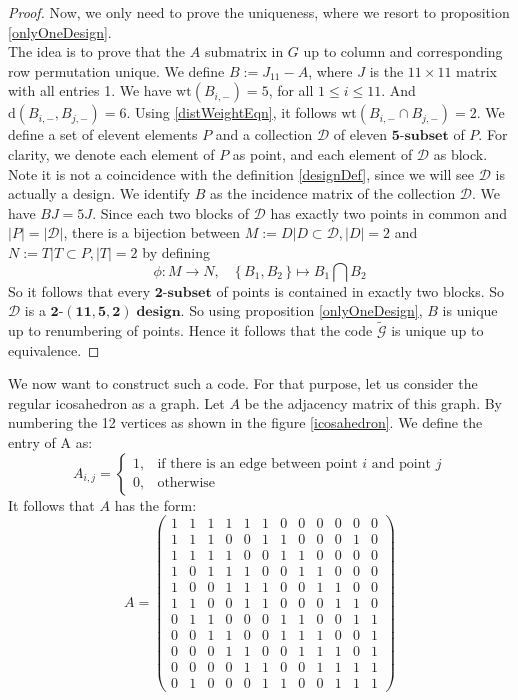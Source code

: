 \documentclass[12pt]{article}
\theoremstyle{definition}
\numberwithin{equation}{theorem}
\numberwithin{figure}{theorem}
\newcommand{\tParamDesign}[4]{\ensuremath{\bm{#1\mbox{-}(#2,#3,#4)\; design}}}
\newcommand{\dDes}{\ensuremath{\mathcal{D}}}
\newcommand{\cCodes}{\ensuremath{\widetilde{\mathcal{G}}}}
\newcommand{\tSubset}[1]{\ensuremath{\bm{#1\mbox{-}{subset}}}}
\newcommand{\wt}[1]{\ensuremath{\text{wt}(#1)}}
\newcommand{\dist}[2]{\ensuremath{\text{d}(#1,#2)}}
\begin{document}
\begin{proof}
Now, we only need to prove the uniqueness, where we resort to proposition \ref{onlyOneDesign}.\\
The idea is to prove that the $A$ submatrix in $G$ up to column and corresponding row permutation %
unique. We define $B := J_{11} - A$, where $J$ is the $11 \times 11$ matrix with all entries 1. We have $\wt{B_{i,-}} = 5$, for all $1 \leq i \leq 11$. And $\dist{B_{i,-}}{B_{j,-}} = 6$. Using \ref{distWeightEqn}, it follows $\wt{B_{i,-} \cap B_{j,-}} = 2$. We define a set of elevent elements $P$ and a collection {\dDes} of eleven {\tSubset{5}} of $P$. For clarity, we denote each element of $P$ as point, and each element of {\dDes} as block. Note it is not a coincidence with the definition \ref{designDef}, since we will see {\dDes} is actually a design. We identify $B$ as the incidence matrix of the collection {\dDes}. We have $BJ = 5J$. Since each two blocks of {\dDes} has exactly two points in common and $|P| = |\dDes|$, there is a bijection between $M  := {D| D \subset \dDes, |D| = 2}$ and $N := {T|T \subset P, |T| = 2}$ by defining 
\[
	\phi: M \rightarrow N, \quad \{\,B_1,B_2\,\} \mapsto B_1 \bigcap B_2
\]
So it follows that every {\tSubset{2}} of points is contained in exactly two blocks. So {\dDes} is a {\tParamDesign{2}{11}{5}{2}}. So using proposition \ref{onlyOneDesign}, $B$ is unique up to renumbering of points. Hence it follows that the code {\cCodes} is unique up to equivalence.
\end{proof}

We now want to construct such a code. For that purpose, let us consider the regular icosahedron as a graph. Let $A$ be the adjacency matrix of this graph. By numbering the 12 vertices as shown in the figure \ref{icosahedron}. We define the entry of A as:
\[
	A_{i,j} = 
	\begin{cases}
		1, &\text{if there is an edge between point $i$ and point $j$}\\
		0, &\text{otherwise}
	\end{cases}
\]
It follows that $A$ has the form:
\[
	A =
	\begin{pmatrix}
		 1 & 1 & 1 & 1 & 1 & 1 & 0 & 0 & 0 & 0 & 0 & 0 \\ 
1 & 1 & 1 & 0 & 0 & 1 & 1 & 0 & 0 & 0 & 1 & 0 \\ 
1 & 1 & 1 & 1 & 0 & 0 & 1 & 1 & 0 & 0 & 0 & 0 \\ 
1 & 0 & 1 & 1 & 1 & 0 & 0 & 1 & 1 & 0 & 0 & 0 \\ 
1 & 0 & 0 & 1 & 1 & 1 & 0 & 0 & 1 & 1 & 0 & 0 \\ 
1 & 1 & 0 & 0 & 1 & 1 & 0 & 0 & 0 & 1 & 1 & 0 \\ 
0 & 1 & 1 & 0 & 0 & 0 & 1 & 1 & 0 & 0 & 1 & 1 \\ 
0 & 0 & 1 & 1 & 0 & 0 & 1 & 1 & 1 & 0 & 0 & 1 \\ 
0 & 0 & 0 & 1 & 1 & 0 & 0 & 1 & 1 & 1 & 0 & 1 \\ 
0 & 0 & 0 & 0 & 1 & 1 & 0 & 0 & 1 & 1 & 1 & 1 \\ 
0 & 1 & 0 & 0 & 0 & 1 & 1 & 0 & 0 & 1 & 1 & 1		
	\end{pmatrix}
\]
\end{document}
